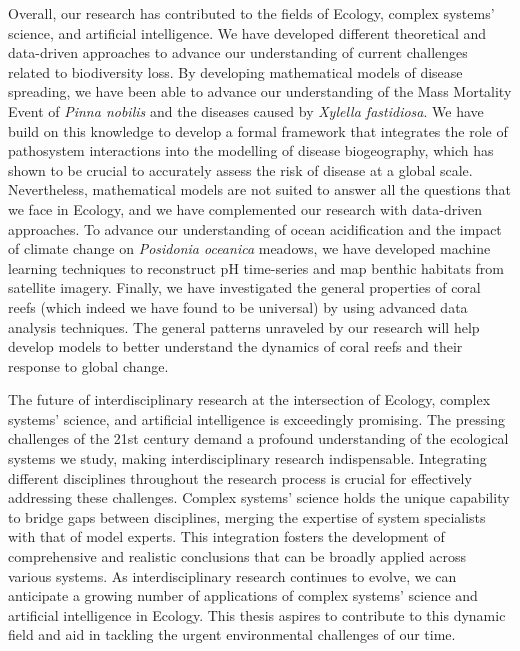 Overall, our research has contributed to the fields of Ecology, complex
systems' science, and artificial intelligence. We have developed different
theoretical and data-driven approaches to advance our understanding of current
challenges related to biodiversity loss. By developing mathematical models of
disease spreading, we have been able to advance our understanding of the Mass
Mortality Event of \textit{Pinna nobilis} and the diseases caused by
\textit{Xylella fastidiosa}. We have build on this knowledge to develop a
formal framework that integrates the role of pathosystem interactions into the
modelling of disease biogeography, which has shown to be crucial to accurately
assess the risk of disease at a global scale. Nevertheless, mathematical models
are not suited to answer all the questions that we face in Ecology, and we have
complemented our research with data-driven approaches. To advance our
understanding of ocean acidification and the impact of climate change on
\textit{Posidonia oceanica} meadows, we have developed machine learning
techniques to reconstruct pH time-series and map benthic habitats from
satellite imagery. Finally, we have investigated the general properties of
coral reefs (which indeed we have found to be universal) by using advanced data
analysis techniques. The general patterns unraveled by our research will help
develop models to better understand the dynamics of coral reefs and their
response to global change.

The future of interdisciplinary research at the intersection of Ecology,
complex systems' science, and artificial intelligence is exceedingly promising.
The pressing challenges of the 21st century demand a profound understanding of
the ecological systems we study, making interdisciplinary research
indispensable. Integrating different disciplines throughout the research
process is crucial for effectively addressing these challenges. Complex
systems' science holds the unique capability to bridge gaps between
disciplines, merging the expertise of system specialists with that of model
experts. This integration fosters the development of comprehensive and
realistic conclusions that can be broadly applied across various systems. As
interdisciplinary research continues to evolve, we can anticipate a growing
number of applications of complex systems' science and artificial intelligence
in Ecology. This thesis aspires to contribute to this dynamic field and aid in
tackling the urgent environmental challenges of our time.

\vfill